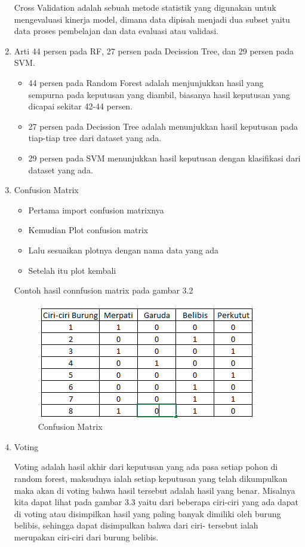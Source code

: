 \begin{enumerate}
\par 
Cross Validation adalah sebuah metode statistik yang digunakan untuk mengevaluasi kinerja model, dimana data dipisah menjadi dua subset yaitu data proses pembelajan dan data evaluasi atau validasi.
\item Arti 44 persen pada RF, 27 persen pada Decission Tree, dan 29 persen pada SVM.
\begin{itemize}
\item 44 persen pada Random Forest adalah menjunjukkan hasil yang sempurna pada keputusan yang diambil, biasanya hasil keputusan yang dicapai sekitar 42-44 persen.
\item 27 persen pada Decission Tree adalah menunjukkan hasil keputusan pada tiap-tiap tree dari dataset yang ada.
\item 29 persen pada SVM menunjukkan hasil keputusan dengan klasifikasi dari dataset yang ada.
\end{itemize}
\item Confusion Matrix
\begin{itemize}
\item Pertama import confusion matrixnya
\item Kemudian Plot confusion matrix
\item Lalu sesuaikan plotnya dengan nama data yang ada
\item Setelah itu plot kembali
\end{itemize}
\par
Contoh hasil connfusion matrix pada gambar 3.2
\begin{figure}[ht]
\centering
\includegraphics[scale=0.9]{figures/RF/1_2.png}
\caption{Confusion Matrix}
\end{figure}
\item Voting
\par
Voting adalah hasil akhir dari keputusan yang ada pasa setiap pohon di random forest, maksudnya ialah setiap keputusan yang telah dikumpulkan maka akan di voting bahwa hasil tersebut adalah hasil yang benar. Misalnya kita dapat lihat pada gambar 3.3 yaitu dari beberapa ciri-ciri yang ada dapat di voting atau disimpilkan hasil yang paling banyak dimiliki oleh burung belibis, sehingga dapat disimpulkan bahwa dari ciri- tersebut ialah merupakan ciri-ciri dari burung belibis. 

\end{enumerate}

